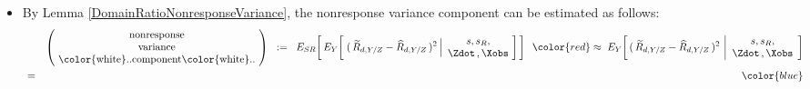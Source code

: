 \begin{itemize}
\item
    By Lemma \ref{DomainRatioNonresponseVariance},
    the nonresponse variance component can be estimated as follows:
    \begin{eqnarray*}
    &&
    \left(\!\begin{array}{c}
        \textnormal{nonresponse}
        \\
        \textnormal{variance}
        \\
        \textnormal{{\color{white}..}component{\color{white}..}}
        \end{array}\!\right)
    \;\; := \;\;
        E_{SR}\!\left[\,
        E_{Y}\!\left[\,
            \left.
            (\,\widetilde{R}_{d,Y/Z} - \widehat{R}_{d,Y/Z}\,)^{2}
            \,\right\vert\!
            \begin{array}{c} s,s_{R}, \\ \Zdot\,,\Xobs \end{array}
            \!\right]
            \,\right]
    \;\; {\color{red}\approx} \;\;
        E_{Y}\!\left[\,
            (\,\widetilde{R}_{d,Y/Z} - \widehat{R}_{d,Y/Z}\,)^{2}
            \,\left\vert
            \begin{array}{c}
                s,s_{R},
                \\
                \Zdot\,,\Xobs
                \end{array}
            \right.
            \!\right]
    \\
    & = &
        {\color{blue}
}
\end{eqnarray*}
\end{itemize}
